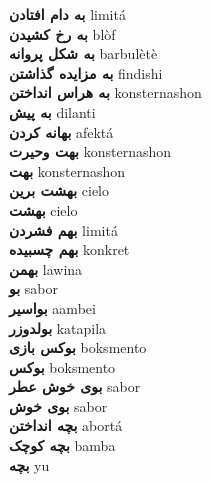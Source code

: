 \textbf{ به دام افتادن  } limitá \\
\textbf{ به رخ کشیدن  } blòf \\
\textbf{ به شکل پروانه  } barbulètè \\
\textbf{ به مزایده گذاشتن  } findishi \\
\textbf{ به هراس انداختن  } konsternashon \\
\textbf{ به پیش  } dilanti \\
\textbf{ بهانه کردن  } afektá \\
\textbf{ بهت وحیرت  } konsternashon \\
\textbf{ بهت  } konsternashon \\
\textbf{ بهشت برین  } cielo \\
\textbf{ بهشت  } cielo \\
\textbf{ بهم فشردن  } limitá \\
\textbf{ بهم چسبیده  } konkret \\
\textbf{ بهمن  } lawina \\
\textbf{ بو  } sabor \\
\textbf{ بواسیر  } aambei \\
\textbf{ بولدوزر  } katapila \\
\textbf{ بوکس بازی  } boksmento \\
\textbf{ بوکس  } boksmento \\
\textbf{ بوی خوش عطر  } sabor \\
\textbf{ بوی خوش  } sabor \\
\textbf{ بچه انداختن  } abortá \\
\textbf{ بچه کوچک  } bamba \\
\textbf{ بچه  } yu \\
